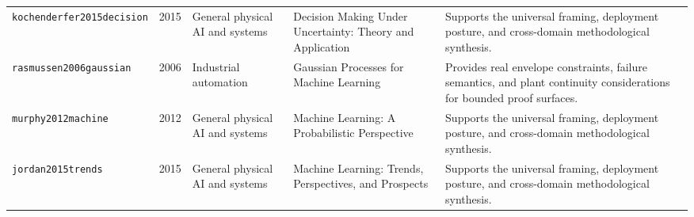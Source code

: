 \begin{longtable}{p{}p{}p{}p{}p{}}
\texttt{kochenderfer2015decision} & 2015 & General physical AI and systems & Decision Making Under Uncertainty: Theory and Application & Supports the universal framing, deployment posture, and cross-domain methodological synthesis.\\
\texttt{rasmussen2006gaussian} & 2006 & Industrial automation & Gaussian Processes for Machine Learning & Provides real envelope constraints, failure semantics, and plant continuity considerations for bounded proof surfaces.\\
\texttt{murphy2012machine} & 2012 & General physical AI and systems & Machine Learning: A Probabilistic Perspective & Supports the universal framing, deployment posture, and cross-domain methodological synthesis.\\
\texttt{jordan2015trends} & 2015 & General physical AI and systems & Machine Learning: Trends, Perspectives, and Prospects & Supports the universal framing, deployment posture, and cross-domain methodological synthesis.\\
\bottomrule
\end{longtable}

